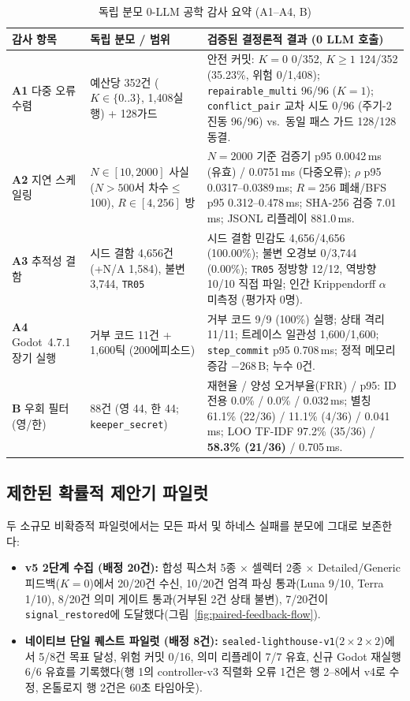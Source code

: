\begin{table}[!tbp]
\caption{독립 분모 0-LLM 공학 감사 요약 (A1--A4, B)}
\label{tab:extended-compact}
\centering
\footnotesize
\begin{tabularx}{\textwidth}{@{}>{\raggedright\arraybackslash}p{}>{\raggedright\arraybackslash}p{}>{\raggedright\arraybackslash}X@{}}
\toprule
\textbf{감사 항목} & \textbf{독립 분모 / 범위} & \textbf{검증된 결정론적 결과 (0 LLM 호출)} \\
\midrule
\textbf{A1} 다중 오류 수렴 & 예산당 352건 ($K{\in}\{0..3\}$, 1,408실행) + 128가드 & 안전 커밋: $K{=}0$ 0/352, $K{\ge}1$ 124/352 (35.23\%, 위험 0/1,408); \texttt{repairable\_multi} 96/96 ($K{=}1$); \texttt{conflict\_pair} 교차 시도 0/96 (주기-2 진동 96/96) vs.\ 동일 패스 가드 128/128 동결. \\
\textbf{A2} 지연 스케일링 & $N{\in}[10,2000]$ 사실 ($N{>}500$서 차수$\le$100), $R{\in}[4,256]$ 방 & $N{=}2000$ 기준 검증기 p95 0.0042\,ms (유효) / 0.0751\,ms (다중오류); $\rho$ p95 0.0317--0.0389\,ms; $R{=}256$ 폐쇄/BFS p95 0.312--0.478\,ms; SHA-256 검증 7.01\,ms; JSONL 리플레이 881.0\,ms. \\
\textbf{A3} 추적성 결함 & 시드 결함 4,656건(+N/A 1,584), 불변 3,744, \texttt{TR05} & 시드 결함 민감도 4,656/4,656 (100.00\%); 불변 오경보 0/3,744 (0.00\%); \texttt{TR05} 정방향 12/12, 역방향 10/10 직접 파일; 인간 Krippendorff $\alpha$ 미측정 (평가자 0명). \\
\textbf{A4} Godot~4.7.1 장기 실행 & 거부 코드 11건 + 1,600틱 (200에피소드) & 거부 코드 9/9 (100\%) 실행; 상태 격리 11/11; 트레이스 일관성 1,600/1,600; \texttt{step\_commit} p95 0.708\,ms; 정적 메모리 증감 $-268$\,B; 누수 0건. \\
\textbf{B} 우회 필터 (영/한) & 88건 (영 44, 한 44; \texttt{keeper\_secret}) & 재현율 / 양성 오거부율(FRR) / p95: ID전용 0.0\% / 0.0\% / 0.032\,ms; 별칭 61.1\% (22/36) / 11.1\% (4/36) / 0.041\,ms; LOO TF-IDF 97.2\% (35/36) / \textbf{58.3\% (21/36)} / 0.705\,ms. \\
\bottomrule
\end{tabularx}
\end{table}

\subsection{제한된 확률적 제안기 파일럿}
두 소규모 비확증적 파일럿에서는 모든 파서 및 하네스 실패를 분모에 그대로 보존한다:
\begin{itemize}
\item \textbf{v5 2단계 수집 (배정 20건):} 합성 픽스처 5종 $\times$ 셀렉터 2종 $\times$ Detailed/Generic 피드백($K{=}0$)에서 20/20건 수신, 10/20건 엄격 파싱 통과(Luna 9/10, Terra 1/10), 8/20건 의미 게이트 통과(거부된 2건 상태 불변), 7/20건이 \texttt{signal\_restored}에 도달했다(그림~\ref{fig:paired-feedback-flow}).
\item \textbf{네이티브 단일 퀘스트 파일럿 (배정 8건):} \texttt{sealed-}\allowbreak\texttt{lighthouse-}\allowbreak\texttt{v1}($2{\times}2{\times}2$)에서 5/8건 목표 달성, 위험 커밋 0/16, 의미 리플레이 7/7 유효, 신규 Godot 재실행 6/6 유효를 기록했다(행 1의 controller-v3 직렬화 오류 1건은 행 2--8에서 v4로 수정, 온톨로지 행 2건은 60초 타임아웃).
\end{itemize}

